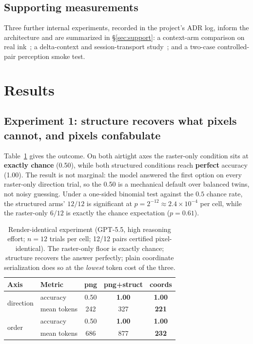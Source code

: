 \documentclass[11pt]{article}
\begin{document}
\subsection{Supporting measurements}
Three further internal experiments, recorded in the project's ADR log, inform the
architecture and are summarized in \S\ref{sec:support}: a context-arm comparison
on real ink~\cite{adr1}; a delta-context and session-transport study~\cite{adr3};
and a two-case controlled-pair perception smoke test.

\section{Results}
\label{sec:results}

\subsection{Experiment 1: structure recovers what pixels cannot, and pixels confabulate}
\label{sec:move1}

Table~\ref{tab:move1} gives the outcome. On both airtight axes the raster-only
condition sits at \textbf{exactly chance} (0.50), while both structured
conditions reach \textbf{perfect} accuracy (1.00). The result is not marginal:
the model answered the first option on every raster-only direction trial, so the
0.50 is a mechanical default over balanced twins, not noisy guessing. Under a
one-sided binomial test against the $0.5$ chance rate, the structured arms'
$12/12$ is significant at $p = 2^{-12} \approx 2.4\times10^{-4}$ per cell, while
the raster-only $6/12$ is exactly the chance expectation ($p = 0.61$).

\begin{table}[t]
\centering
\small
\begin{tabular}{@{}l l ccc@{}}
\toprule
\textbf{Axis} & \textbf{Metric} & \textbf{png} & \textbf{png+struct} & \textbf{coords} \\
\midrule
\multirow{2}{*}{direction}
 & accuracy & 0.50 & \textbf{1.00} & \textbf{1.00} \\
 & mean tokens & 242 & 327 & \textbf{221} \\
\midrule
\multirow{2}{*}{order}
 & accuracy & 0.50 & \textbf{1.00} & \textbf{1.00} \\
 & mean tokens & 686 & 877 & \textbf{232} \\
\bottomrule
\end{tabular}
\caption{Render-identical experiment (GPT-5.5, high reasoning effort; $n=12$
trials per cell; 12/12 pairs certified pixel-identical). The raster-only floor is
exactly chance; structure recovers the answer perfectly; plain coordinate
serialization does so at the \emph{lowest} token cost of the three.}
\label{tab:move1}
\end{table}
\end{document}
